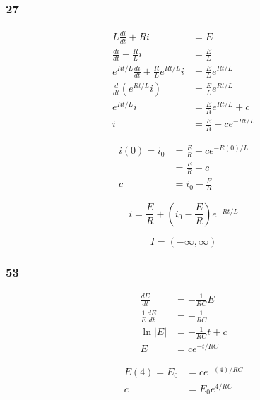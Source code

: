 \documentclass{article}
\begin{document}
\subsubsection{27}

\begin{align*}
  L \frac{d i}{d t} + R i                                 & = E                            \\
  \frac{d i}{d t} + \frac{R}{L} i                         & = \frac{E}{L}                  \\
  e^{R t / L} \frac{d i}{d t} + \frac{R}{L} e^{R t / L} i & = \frac{E}{L} e^{R t / L}      \\
  \frac{d}{dt} (e^{R t/ L} i)                             & = \frac{E}{L} e^{R t / L}      \\
  e^{R t / L} i                                           & = \frac{E}{R} e^{R t / L} + c  \\
  i                                                       & = \frac{E}{R} + c e^{-R t / L}
\end{align*}

\begin{align*}
  i(0) = i_0 & = \frac{E}{R} + c e^{-R (0) / L} \\
             & = \frac{E}{R} + c                \\
  c          & = i_0 - \frac{E}{R}
\end{align*}

\[i = \frac{E}{R} + \left( i_0 - \frac{E}{R} \right) e^{-R t / L}\]

\[I = (-\infty, \infty)\]

\subsubsection{53}

\begin{align*}
  \frac{d E}{d t}             & = -\frac{1}{R C} E     \\
  \frac{1}{E} \frac{d E}{d t} & = -\frac{1}{R C}       \\
  \ln |E|                     & = -\frac{1}{R C} t + c \\
  E                           & = c e^{-t / R C}
\end{align*}

\begin{align*}
  E(4) = E_0 & = c e^{-(4) / R C} \\
  c          & = E_0 e^{4 / R C}
\end{align*}
\end{document}
